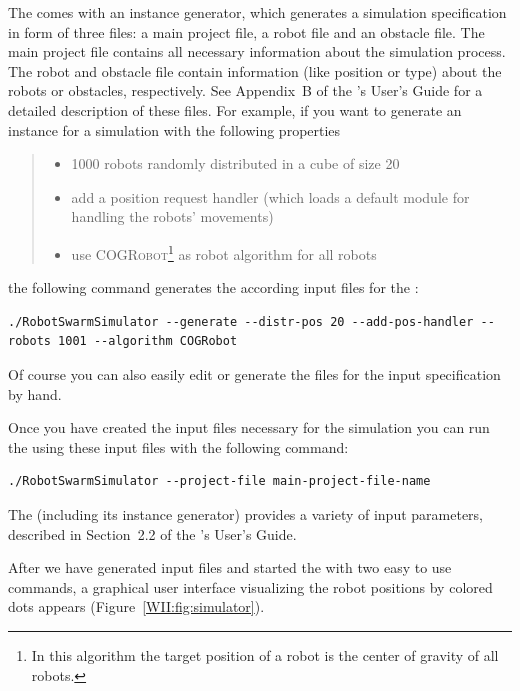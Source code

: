 The \RSS comes with an instance generator, which generates a simulation specification in form of three files: a main project file, a robot file and an obstacle file.
The main project file contains all necessary information about the simulation process. The robot and obstacle file contain information (like position or type) about the robots or obstacles, respectively. See Appendix~B of the \RSS's User's Guide \cite{WII:cite:usersguide} for a detailed description of these files. 
For example, if you want to generate an instance for a simulation with the following properties
\begin{quote}
\begin{itemize}
	\item 1000 robots randomly distributed in a cube of size 20
	\item add a position request handler (which loads a default module for handling the robots' movements)
	\item use \textsc{COGRobot}\footnote{In this algorithm the target position of a robot is the center of gravity of all robots.} as robot algorithm for all robots
\end{itemize}
\end{quote}
the following command generates the according input files for the \RSS:
\lstset{language=C++}
\begin{lstlisting}[numbers=none]
./RobotSwarmSimulator --generate --distr-pos 20 --add-pos-handler --robots 1001 --algorithm COGRobot
\end{lstlisting}
Of course you can also easily edit or generate the files for the input specification by hand.\medskip

Once you have created the input files necessary for the simulation you can run the \RSS using these input files with the following command:
\lstset{language=C++}
\begin{lstlisting}[numbers=none]
./RobotSwarmSimulator --project-file main-project-file-name
\end{lstlisting}
The \RSS (including its instance generator) provides a variety of input parameters, described in Section~2.2 of the \RSS's User's Guide.\medskip

After we have generated input files and started the \RSS with two easy to use commands, a graphical user interface visualizing the robot positions by colored dots appears (Figure~\ref{WII:fig:simulator}).\medskip

